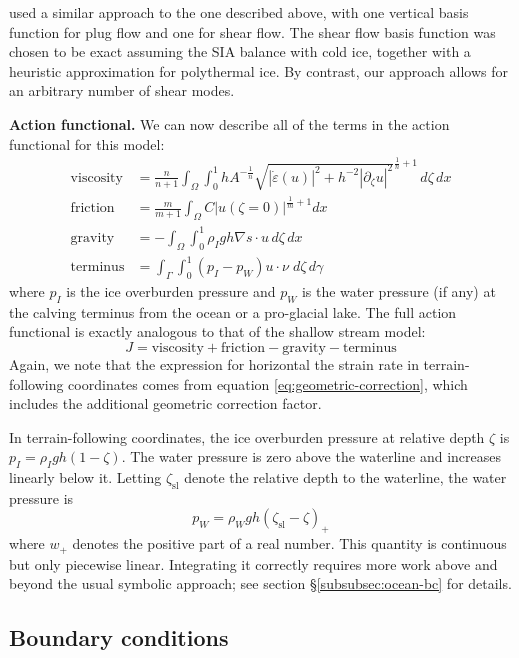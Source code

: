 \documentclass[journal abbreviation, manuscript]{copernicus}
\begin{document}
\citet{brinkerhoff2015dynamics} used a similar approach to the one described above, with one vertical basis function for plug flow and one for shear flow.
The shear flow basis function was chosen to be exact assuming the SIA balance with cold ice, together with a heuristic approximation for polythermal ice.
By contrast, our approach allows for an arbitrary number of shear modes.

\textbf{Action functional.}
We can now describe all of the terms in the action functional for this model:
\begin{align}
    \text{viscosity} & = \frac{n}{n + 1}\int_\Omega\int_0^1hA^{-\frac{1}{n}}\sqrt{|\dot\varepsilon(u)|^2 + h^{-2}|\partial_\zeta u|^2}^{\frac{1}{n} + 1}\,d\zeta\,dx \\
    \text{friction} & = \frac{m}{m + 1}\int_\Omega C|u(\zeta = 0)|^{\frac{1}{m} + 1}dx \\
    \text{gravity} & = -\int_\Omega\int_0^1\rho_Igh\nabla s\cdot u\,d\zeta\,dx \\
    \text{terminus} & = \int_\Gamma\int_0^1(p_I - p_W)u\cdot\nu\;d\zeta\,d\gamma
\end{align}
where $p_I$ is the ice overburden pressure and $p_W$ is the water pressure (if any) at the calving terminus from the ocean or a pro-glacial lake.
The full action functional is exactly analogous to that of the shallow stream model:
\begin{equation}
    J = \text{viscosity} + \text{friction} - \text{gravity} - \text{terminus}
\end{equation}
Again, we note that the expression for horizontal the strain rate in terrain-following coordinates comes from equation \eqref{eq:geometric-correction}, which includes the additional geometric correction factor.

In terrain-following coordinates, the ice overburden pressure at relative depth $\zeta$ is $p_I = \rho_Igh(1 - \zeta)$.
The water pressure is zero above the waterline and increases linearly below it.
Letting $\zeta_{\text{sl}}$ denote the relative depth to the waterline, the water pressure is
\begin{equation}
    p_W = \rho_Wgh(\zeta_{\text{sl}} - \zeta)_+
\end{equation}
where $w_+$ denotes the positive part of a real number.
This quantity is continuous but only piecewise linear.
Integrating it correctly requires more work above and beyond the usual symbolic approach; see section \S\ref{subsubsec:ocean-bc} for details.

\subsection{Boundary conditions}
\end{document}
